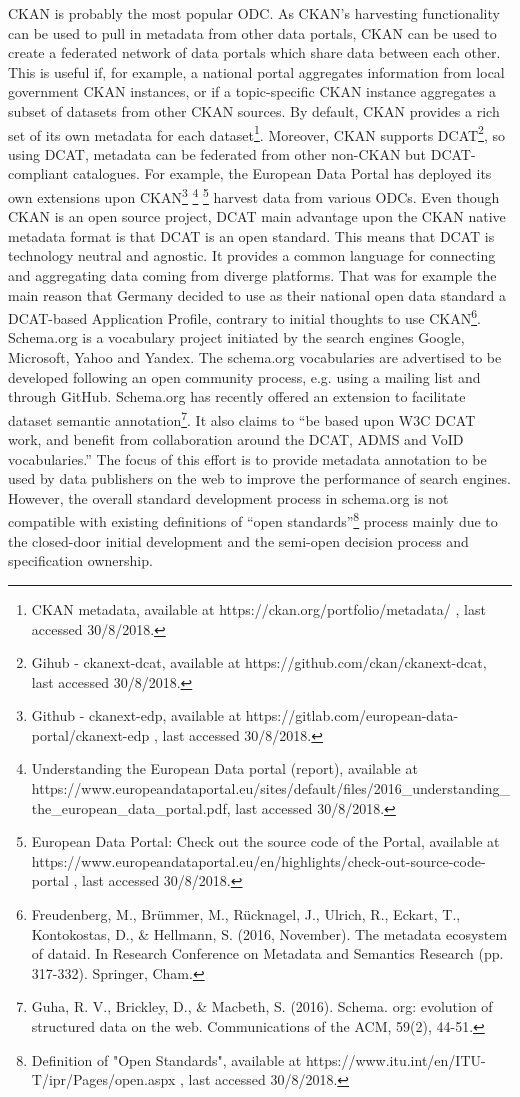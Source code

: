 \documentclass[<options>]{elsarticle}
\begin{document}
CKAN is probably the most popular ODC. As CKAN’s harvesting functionality can be used to pull in metadata from other data portals, CKAN can be used to create a federated network of data portals which share data between each other. This is useful if, for example, a national portal aggregates information from local government CKAN instances, or if a topic-specific CKAN instance aggregates a subset of datasets from other CKAN sources. By default, CKAN provides a rich set of its own metadata for each dataset\footnote{CKAN metadata, available at https://ckan.org/portfolio/metadata/ , last accessed 30/8/2018.}. Moreover, CKAN supports DCAT\footnote{Gihub - ckanext-dcat, available at https://github.com/ckan/ckanext-dcat, last accessed 30/8/2018. }, so using DCAT, metadata can be federated from other non-CKAN but DCAT-compliant catalogues. For example, the European Data Portal has deployed its own extensions upon CKAN\footnote{Github - ckanext-edp, available at https://gitlab.com/european-data-portal/ckanext-edp , last accessed 30/8/2018.} \footnote{Understanding the European Data portal (report), available at https://www.europeandataportal.eu/sites/default/files/2016\_understanding\_the\_european\_data\_portal.pdf, last accessed 30/8/2018.} \footnote{ European Data Portal:  Check out the source code of the Portal, available at https://www.europeandataportal.eu/en/highlights/check-out-source-code-portal , last accessed 30/8/2018. } harvest data from various ODCs. Even though CKAN is an open source project, DCAT main advantage upon the CKAN native metadata format is that DCAT is an open standard. This means that DCAT is technology neutral and agnostic. It provides a common language for connecting and aggregating data coming from diverge platforms. That was for example the main reason that Germany decided to use as their national open data standard a DCAT-based Application Profile, contrary to initial thoughts to use CKAN\footnote{Freudenberg, M., Brümmer, M., Rücknagel, J., Ulrich, R., Eckart, T., Kontokostas, D., \& Hellmann, S. (2016, November). The metadata ecosystem of dataid. In Research Conference on Metadata and Semantics Research (pp. 317-332). Springer, Cham. }.   
Schema.org is a vocabulary project initiated by the search engines Google, Microsoft, Yahoo and Yandex. The schema.org vocabularies are advertised to be developed following an open community process, e.g. using a mailing list and through GitHub. Schema.org has recently offered an extension to facilitate dataset semantic annotation\footnote{ Guha, R. V., Brickley, D., \& Macbeth, S. (2016). Schema. org: evolution of structured data on the web. Communications of the ACM, 59(2), 44-51.}. It also claims to “be based upon W3C DCAT work, and benefit from collaboration around the DCAT, ADMS and VoID vocabularies.” The focus of this effort is to provide metadata annotation to be used by data publishers on the web to improve the performance of search engines. However, the overall standard development process in schema.org is not compatible with existing definitions of “open standards”\footnote{Definition of "Open Standards", available at https://www.itu.int/en/ITU-T/ipr/Pages/open.aspx , last accessed 30/8/2018.} process mainly due to the closed-door initial development and the semi-open decision process and specification ownership.
\end{document}
